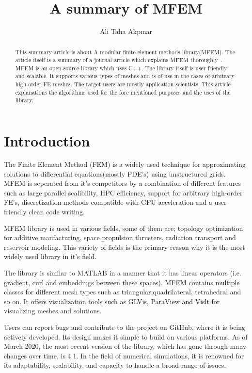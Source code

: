 \documentclass{article}
\title{A summary of MFEM}
\author{Ali Taha Akpınar}
\begin{document}
\maketitle

\begin{abstract}
This summary article is about A modular finite element methods library(MFEM). The article itself is a summary of a journal article which explains MFEM thoroughly~\cite{ANDERSON202142}.   MFEM is an open-source library which uses C++. The library itself is user friendly and scalable. It supports various types of meshes and is of use in the cases of arbitrary high-order FE meshes. The target users are mostly application scientists. This article explanations the algorithms used for the fore mentioned purposes and the uses of the library.
\end{abstract}

\section{Introduction}

The Finite Element Method (FEM) is a widely used technique for approximating solutions to differential equations(mostly PDE's) using unstructured grids. 
MFEM is seperated from it's competitors by a combination of different features such as large parallel scalibility, HPC efficiency, support for arbitrary high-order FE's, discretization methods compatible with GPU acceleration and a user friendly clean code writing.

MFEM library is used in various fields, some of them are; topology optimization for additive maufacturing, space propulsion thrusters, radiation transport and reservoir modeling. This variety of fields is the primary reason why it is the most widely used library in it's field. 

The library is similar to MATLAB in a manner that it has linear operators (i.e. gradient, curl and embeddings between these spaces). MFEM contains multiple classes for different mesh types such as triangular,quadrilateral, tetrahedral and so on. It offers visualization tools such as GLVis, ParaView and Vislt for visualizing meshes and solutions.


Users can report bugs and contribute to the project on GitHub, where it is being actively developed. Its design makes it simple to build on various platforms. As of March 2020, the most recent version of the library, which has gone through many changes over time, is 4.1. In the field of numerical simulations, it is renowned for its adaptability, scalability, and capacity to handle a broad range of issues.
\end{document}
